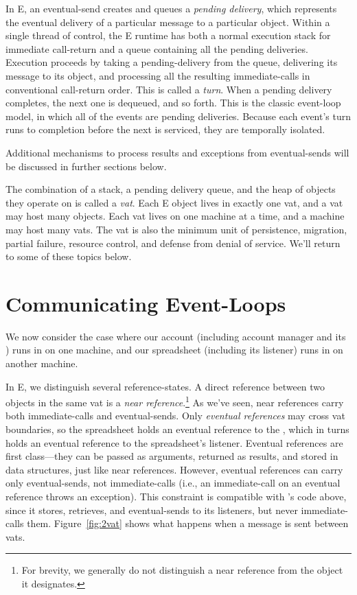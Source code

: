 \documentclass{llncs}
\begin{document}
In E, an eventual-send creates and queues a \emph{pending delivery},
which represents the eventual delivery of a particular message to a
particular object.  Within a single thread of control, the E runtime
has both a normal execution stack for immediate call-return and a
queue containing all the pending deliveries.  Execution proceeds by
taking a pending-delivery from the queue, delivering its message to
its object, and processing all the resulting immediate-calls in
conventional call-return order.  This is called a \emph{turn}.  When a
pending delivery completes, the next one is dequeued, and so forth.
This is the classic event-loop model, in which all of the events are
pending deliveries. Because each event's turn runs to completion
before the next is serviced, they are temporally isolated.

Additional mechanisms to process results and exceptions from
eventual-sends will be discussed in further sections below.

The combination of a stack, a pending delivery queue, and the heap of
objects they operate on is called a \emph{vat}.  Each E object lives
in exactly one vat, and a vat may host many objects.  Each vat lives
on one machine at a time, and a machine may host many vats. The vat is
also the minimum unit of persistence, migration, partial failure,
resource control, and defense from denial of service. We'll return to
some of these topics below.

\section{Communicating Event-Loops}

We now consider the case where our account (including account manager
and its ) runs in  on one machine, and our
spreadsheet (including its listener) runs in  on another
machine.

In E, we distinguish several reference-states. A direct reference
between two objects in the same vat is a \emph{near
reference}.\footnote{
%
For brevity, we generally do not distinguish a near reference from the
object it designates.}
%
As we've seen, near references carry both immediate-calls and
eventual-sends. Only \emph{eventual references} may cross vat
boundaries, so the spreadsheet holds an eventual reference to the
, which in turns holds an eventual reference to the
spreadsheet's listener. Eventual references are first class---they can
be passed as arguments, returned as results, and stored in data
structures, just like near references. However, eventual references
can carry only eventual-sends, not immediate-calls (i.e., an
immediate-call on an eventual reference throws an exception). This
constraint is compatible with 's code above, since
it stores, retrieves, and eventual-sends to its listeners, but never
immediate-calls them.  Figure~\ref{fig:2vat} shows what happens when a
message is sent between vats.
\end{document}
